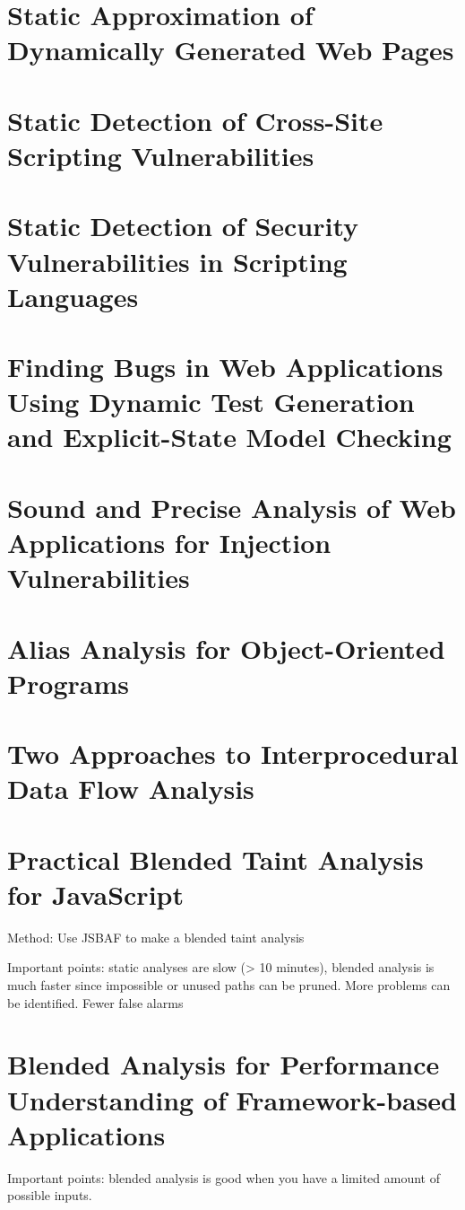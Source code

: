 \section{Static Approximation of Dynamically Generated Web Pages}

\section{Static Detection of Cross-Site Scripting Vulnerabilities}

\section{Static Detection of Security Vulnerabilities in Scripting Languages}

\section{Finding Bugs in Web Applications Using Dynamic Test Generation and Explicit-State Model Checking}

\section{Sound and Precise Analysis of Web Applications for Injection Vulnerabilities}

\section{Alias Analysis for Object-Oriented Programs}

\section{Two Approaches to Interprocedural Data Flow Analysis}

\section{Practical Blended Taint Analysis for JavaScript}
Method: Use JSBAF to make a blended taint analysis

Important points: static analyses are slow (> 10 minutes), blended analysis is much faster since impossible or unused paths can be pruned. More problems can be identified. Fewer false alarms

\section{Blended Analysis for Performance Understanding of Framework-based Applications}
Important points: blended analysis is good when you have a limited amount of possible inputs.
